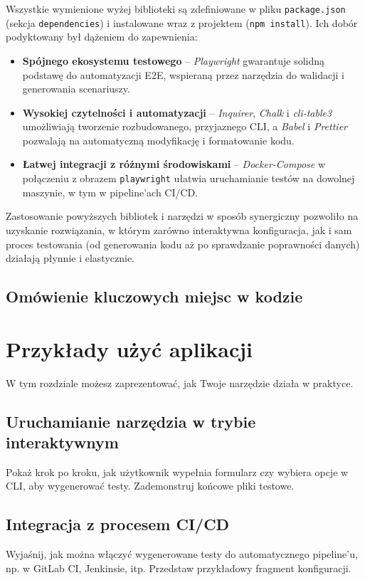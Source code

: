 \documentclass[12pt]{report}
\begin{document}
Wszystkie wymienione wyżej biblioteki są zdefiniowane w pliku \texttt{package.json} (sekcja \texttt{dependencies}) i instalowane wraz z projektem (\verb|npm install|). Ich dobór podyktowany był dążeniem do zapewnienia:
\begin{itemize}
    \item \textbf{Spójnego ekosystemu testowego} -- \emph{Playwright} gwarantuje solidną podstawę do automatyzacji E2E, wspieraną przez narzędzia do walidacji i generowania scenariuszy.
    \item \textbf{Wysokiej czytelności i automatyzacji} -- \emph{Inquirer}, \emph{Chalk} i \emph{cli-table3} umożliwiają tworzenie rozbudowanego, przyjaznego CLI, a \emph{Babel} i \emph{Prettier} pozwalają na automatyczną modyfikację i formatowanie kodu.
    \item \textbf{Łatwej integracji z różnymi środowiskami} -- \emph{Docker-Compose} w połączeniu z obrazem \texttt{playwright} ułatwia uruchamianie testów na dowolnej maszynie, w tym w pipeline’ach CI/CD.
\end{itemize}

Zastosowanie powyższych bibliotek i narzędzi w sposób synergiczny pozwoliło na uzyskanie rozwiązania, w którym zarówno interaktywna konfiguracja, jak i sam proces testowania (od generowania kodu aż po sprawdzanie poprawności danych) działają płynnie i elastycznie.

\section{Omówienie kluczowych miejsc w kodzie}
\label{sec:omowienie-miejsc-w-kodzie}

\chapter{Przykłady użyć aplikacji}
{W tym rozdziale możesz zaprezentować, jak Twoje narzędzie działa w praktyce.}

\section{Uruchamianie narzędzia w trybie interaktywnym}
{Pokaż krok po kroku, jak użytkownik wypełnia formularz czy wybiera opcje w CLI, aby wygenerować testy. Zademonstruj końcowe pliki testowe.}

\section{Integracja z procesem CI/CD}
{Wyjaśnij, jak można włączyć wygenerowane testy do automatycznego pipeline’u, np. w GitLab CI, Jenkinsie, itp. Przedstaw przykładowy fragment konfiguracji.}
\end{document}
